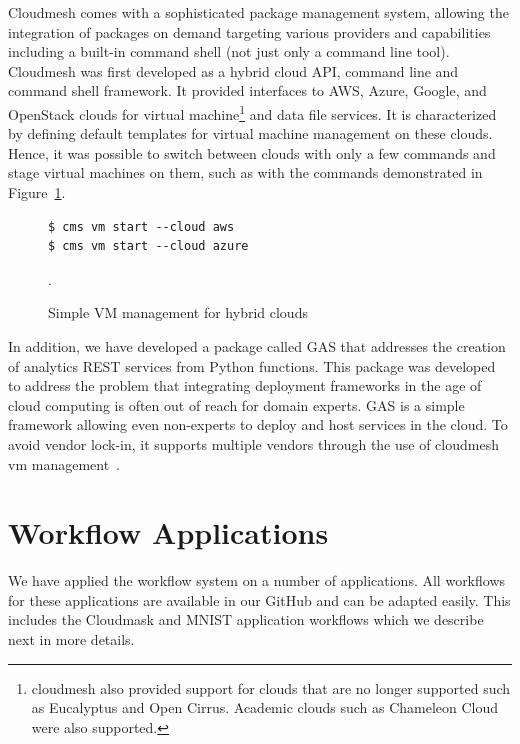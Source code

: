 Cloudmesh comes with a sophisticated package management system,
allowing the integration of packages on demand targeting various providers
and capabilities including a built-in command shell (not just only
a command line tool). Cloudmesh was first developed as a hybrid cloud
API, command line and command shell framework. It provided interfaces
to AWS, Azure, Google, and OpenStack clouds for virtual
machine\footnote{cloudmesh also provided support for clouds that are no
longer supported such as Eucalyptus and Open Cirrus. Academic clouds
such as Chameleon Cloud were also supported.} and data file services. It
is characterized by defining default templates for virtual machine
management on these clouds. Hence, it was possible to switch between clouds
with only a few commands and stage virtual machines on them, such
as with the commands demonstrated in Figure~\ref{fig:cms}.

\begin{figure}[htb]

\begin{verbatim}
$ cms vm start --cloud aws
$ cms vm start --cloud azure
\end{verbatim}

  \caption{Simple VM management for hybrid clouds}
\label{fig:cms}.
\end{figure}  

In addition, we have developed a package called GAS that addresses
the creation of analytics REST services from Python functions. This
package was developed to address the problem that integrating
deployment frameworks in the age of cloud computing is often out of
reach for domain experts. GAS is a simple framework allowing even
non-experts to deploy and host services in the cloud. To avoid vendor
lock-in, it supports multiple vendors through the use of cloudmesh vm
management~\cite{las21-gas}.


% 

\section{Workflow Applications}

We have applied the workflow system on a number of applications. All
workflows for these applications are available in our GitHub and can
be adapted easily. This includes the Cloudmask and MNIST application
workflows which we describe next in more details.




